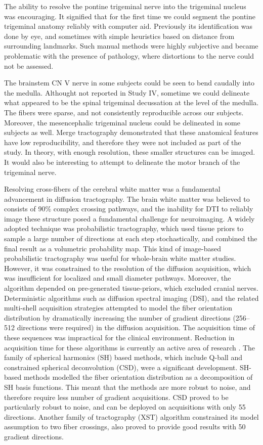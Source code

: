 The ability to resolve the pontine trigeminal nerve into the trigeminal nucleus was encouraging. It signified that for the first time we could segment the pontine trigeminal anatomy reliably with computer aid. Previously its identification was done by eye, and sometimes with simple heuristics based on distance from surrounding landmarks. Such manual methods were highly subjective and became problematic with the presence of pathology, where distortions to the nerve could not be assessed. 

The brainstem CN V nerve in some subjects could be seen to bend caudally into the medulla. Althought not reported in Study IV, sometime we could delineate what appeared to be the spinal trigeminal decussation at the level of the medulla. The fibers were sparse, and not consistently reproducible across our subjects. Moreover, the mesencephalic trigeminal nucleus could be delineated in some subjects as well. Merge tractography demonstrated that these anatomical features have low reproducibility, and therefore they were not included as part of the study. In theory, with enough resolution, these smaller structures can be imaged. It would also be interesting to attempt to delineate the motor branch of the trigeminal nerve. 

Resolving cross-fibers of the cerebral white matter was a fundamental advancement in diffusion tractography. The brain white matter was believed to consists of 90\% complex crossing pathways, and the inability for DTI to reliably image these structure posed a fundamental challenge for neuroimaging. 
A widely adopted technique was probabilistic tractography, which used tissue priors to sample a large number of directions at each step stochastically, and combined the final result as a volumetric probability map. This kind of image-based probabilistic tractography was useful for whole-brain white matter studies. However, it was constrained to the resolution of the diffusion acquisition, which was insufficient for localized and small diameter pathways. Moreover, the algorithm depended on pre-generated tissue-priors, which excluded cranial nerves. 
Deterministic algorithms such as diffusion spectral imaging (DSI), and the related multi-shell acquisition strategies attempted to model the fiber orientation distribution by dramatically increasing the number of gradient directions (256--512 directions were required) in the diffusion acquisition. The acquisition time of these sequences was impractical for the clinical environment. Reduction in acquisition time for these algorithms is currently an active area of research \cite{}.
The family of spherical harmonics (SH) based methods, which include Q-ball and constrained spherical deconvolution (CSD), were a significant development. SH-based methods modelled the fiber orientation distribution as a decomposition of SH basis functions. This meant that the methods are more robust to noise, and therefore require less number of gradient acquisitions. CSD proved to be particularly robust to noise, and can be deployed on acquisitions with only 55 directions. Another family of tractography (XST) algorithm constrained its model assumption to two fiber crossings, also proved to provide good results with 50 gradient directions.

